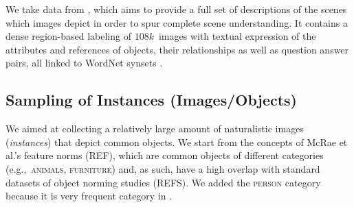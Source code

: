 We take data from \vgenome \cite{krishna2016visualgenome}, which aims to provide a full set of descriptions of the scenes which images depict in order to spur complete scene understanding. 
It contains a dense region-based labeling of $108k$~images with textual expression of the attributes and references of objects, their relationships as well as question answer pairs, all linked to WordNet synsets \cite[see below]{fellbaum1998wordnet}.






\subsection{Sampling of Instances (Images/Objects)}

We aimed at collecting a relatively large amount of naturalistic images (\textit{instances}) that depict common objects.
We start from the concepts of McRae et al.'s feature norms (REF), which are common objects of different categories (e.g.,~\textsc{animals}, \textsc{furniture}) and, as such, have a high overlap with standard datasets of object norming studies (REFS).
We added the \textsc{person} category because it is very frequent category in \vgenome.

